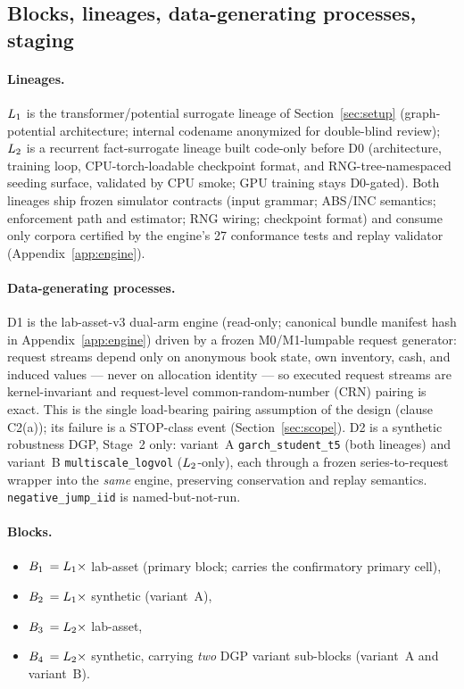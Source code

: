 \subsection{Blocks, lineages, data-generating processes, staging}
\label{sec:cube-blocks}

\paragraph{Lineages.}
$L_{1}$ is the transformer/potential surrogate lineage of
Section~\ref{sec:setup} (graph-potential architecture; internal codename
anonymized for double-blind review);
$L_{2}$ is a recurrent fact-surrogate lineage built code-only before D0
(architecture, training loop, CPU-torch-loadable checkpoint format, and
RNG-tree-namespaced seeding surface, validated by CPU smoke; GPU training
stays D0-gated). Both lineages ship frozen simulator contracts (input grammar;
ABS/INC semantics; enforcement path and estimator; RNG wiring; checkpoint
format) and consume only corpora certified by the engine's 27 conformance
tests and replay validator (Appendix~\ref{app:engine}).

\paragraph{Data-generating processes.}
D1 is the lab-asset-v3 dual-arm engine (read-only; canonical bundle manifest
hash in Appendix~\ref{app:engine}) driven by a frozen M0/M1-lumpable
request generator: request
streams depend only on anonymous book state, own inventory, cash, and induced
values --- never on allocation identity --- so executed request streams are
kernel-invariant and request-level common-random-number (CRN) pairing is
exact. This is the single load-bearing pairing assumption of the design
(clause C2(a)); its failure is a STOP-class event
(Section~\ref{sec:scope}). D2 is a synthetic robustness DGP, Stage~2 only:
variant~A \texttt{garch\_student\_t5} (both lineages) and variant~B
\texttt{multiscale\_logvol} ($L_{2}$-only), each through a frozen
series-to-request wrapper into the \emph{same} engine, preserving
conservation and replay semantics. \texttt{negative\_jump\_iid} is
named-but-not-run.

\paragraph{Blocks.}
\begin{itemize}
\item $B_{1}$ $= L_{1} \times$ lab-asset (primary block; carries the
  confirmatory primary cell),
\item $B_{2}$ $= L_{1} \times$ synthetic (variant~A),
\item $B_{3}$ $= L_{2} \times$ lab-asset,
\item $B_{4}$ $= L_{2} \times$ synthetic, carrying \emph{two} DGP
  variant sub-blocks (variant~A and variant~B).
\end{itemize}

